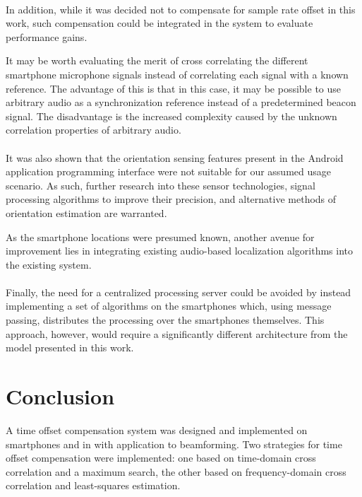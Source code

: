\documentclass[a4paper, notitlepage]{report}
\begin{document}
\paragraph*{}
In addition, while it was decided not to compensate for sample rate offset in this work, such compensation could be integrated in the system to evaluate performance gains.

It may be worth evaluating the merit of cross correlating the different smartphone microphone signals instead of correlating each signal with a known reference. The advantage of this is that in this case, it may be possible to use arbitrary audio as a synchronization reference instead of a predetermined beacon signal. The disadvantage is the increased complexity caused by the unknown correlation properties of arbitrary audio.

\paragraph*{}
It was also shown that the orientation sensing features present in the Android application programming interface were not suitable for our assumed usage scenario. As such, further research into these sensor technologies, signal processing algorithms to improve their precision, and alternative methods of orientation estimation are warranted.

As the smartphone locations were presumed known, another avenue for improvement lies in integrating existing audio-based localization algorithms \cite{hennecke2011} into the existing system.

\paragraph*{}
Finally, the need for a centralized processing server could be avoided by instead implementing a set of algorithms on the smartphones which, using message passing, distributes the processing over the smartphones themselves. This approach, however, would require a significantly different architecture from the model presented in this work.

\section{Conclusion}

A time offset compensation system was designed and implemented on smartphones and in \matlab with application to beamforming. Two strategies for time offset compensation were implemented: one based on time-domain cross correlation and a maximum search, the other based on frequency-domain cross correlation and least-squares estimation.
\end{document}
